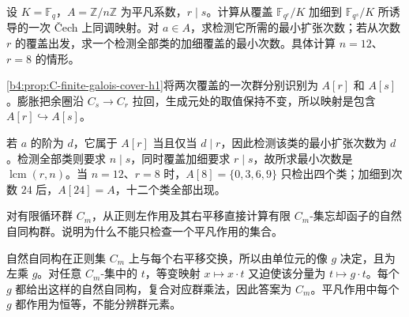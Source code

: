 \begin{exercise}\label{b4:ex:C-galois-cover-level}
	设 \(K=\mathbb F_q\)，\(A=\mathbb Z/n\mathbb Z\) 为平凡系数，\(r\mid s\)。计算从覆盖 \(\mathbb F_{q^r}/K\) 加细到 \(\mathbb F_{q^s}/K\) 所诱导的一次 Čech 上同调映射。对 \(a\in A\)，求检测它所需的最小扩张次数；若从次数 \(r\) 的覆盖出发，求一个检测全部类的加细覆盖的最小次数。具体计算 \(n=12\)、\(r=8\) 的情形。
\end{exercise}
\begin{solution}
	\cref{b4:prop:C-finite-galois-cover-h1}将两次覆盖的一次群分别识别为 \(A[r]\) 和 \(A[s]\)。膨胀把余圈沿 \(C_s\to C_r\) 拉回，生成元处的取值保持不变，所以映射是包含 \(A[r]\hookrightarrow A[s]\)。

	若 \(a\) 的阶为 \(d\)，它属于 \(A[r]\) 当且仅当 \(d\mid r\)，因此检测该类的最小扩张次数为 \(d\)。检测全部类则要求 \(n\mid s\)，同时覆盖加细要求 \(r\mid s\)，故所求最小次数是 \(\operatorname{lcm}(r,n)\)。当 \(n=12\)、\(r=8\) 时，\(A[8]=\{0,3,6,9\}\) 只检出四个类；加细到次数 \(24\) 后，\(A[24]=A\)，十二个类全部出现。
\end{solution}

\begin{exercise}\label{b4:ex:C-fiber-finite-cyclic}
	对有限循环群 \(C_m\)，从正则左作用及其右平移直接计算有限 \(C_m\)-集忘却函子的自然自同构群。说明为什么不能只检查一个平凡作用的集合。
\end{exercise}
\begin{solution}
	自然自同构在正则集 \(C_m\) 上与每个右平移交换，所以由单位元的像 \(g\) 决定，且为左乘 \(g\)。对任意 \(C_m\)-集中的 \(t\)，等变映射 \(x\mapsto x\cdot t\) 又迫使该分量为 \(t\mapsto g\cdot t\)。每个 \(g\) 都给出这样的自然自同构，复合对应群乘法，因此答案为 \(C_m\)。平凡作用中每个 \(g\) 都作用为恒等，不能分辨群元素。
\end{solution}

